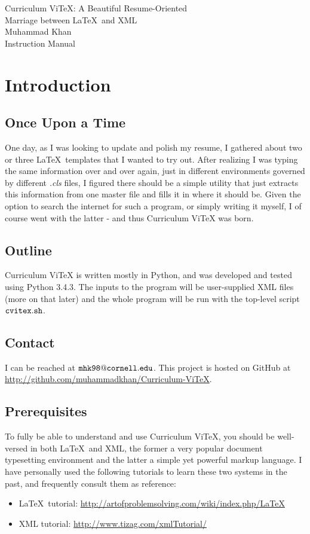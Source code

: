 \documentclass[12pt]{article}
\begin{document}
\begin{titlepage}
  \vspace*{\fill}
  \begin{center}
    {\Huge Curriculum ViTeX: A Beautiful Resume-Oriented\\
           Marriage between \LaTeX\ and XML}\\[0.5cm]
    {\Large Muhammad Khan}\\[0.4cm]
    Instruction Manual
  \end{center}
  \vspace*{\fill}
\end{titlepage}
\section*{Introduction}
\subsection*{Once Upon a Time}
One day, as I was looking to update and polish my resume, I gathered about
two or three \LaTeX\ templates that I wanted to try out. After realizing
I was typing the same information over and over again, just in different
environments governed by different \emph{.cls} files, I figured there should be
a simple utility that just extracts this information from one master file and
fills it in where it should be. Given the option to search the internet for such
a program, or simply writing it myself, I of course went with the latter -
and thus Curriculum ViTeX was born.
\subsection*{Outline}
Curriculum ViTeX is written mostly in Python, and was developed and tested using
Python 3.4.3. The inputs to the program will be user-supplied XML files (more 
on that later) and the whole program will be run with the top-level script $\tt{cvitex.sh}$.
\subsection*{Contact}
I can be reached at $\tt{mhk98@cornell.edu}$. This project is hosted
on GitHub at \url{http://github.com/muhammadkhan/Curriculum-ViTeX}.
\subsection*{Prerequisites}
To fully be able to understand and use Curriculum ViTeX, you should
be well-versed in both \LaTeX\ and XML, the former a very popular
document typesetting environment and the latter a simple yet powerful
markup language. I have personally used the following tutorials to
learn these two systems in the past, and frequently consult them
as reference:
\begin{itemize}
\item \LaTeX\ tutorial: \url{http://artofproblemsolving.com/wiki/index.php/LaTeX}
\item XML tutorial: \url{http://www.tizag.com/xmlTutorial/}
\end{itemize}
\end{document}
